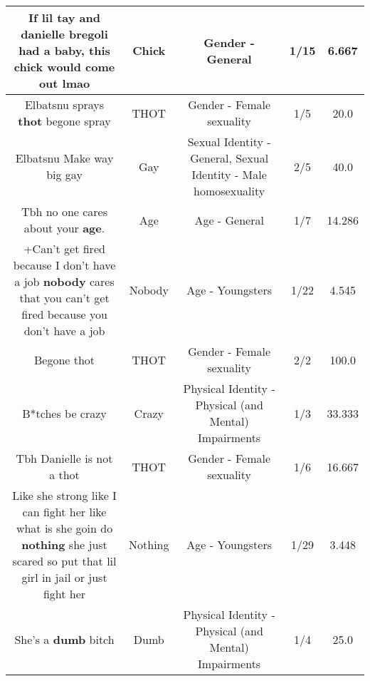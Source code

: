 \documentclass[11pt]{article}
\newlength\mylength
\begin{document}
\begin{center}
\begin{longtable}{|C{.65\mylength}|C{.30\mylength}|C{.12\mylength}|C{.12\mylength}|C{.12\mylength}|}
  \small If lil tay and danielle bregoli had a baby, this \textbf{chick} would come out lmao\normalsize   & Chick & Gender - General & 1/15 & 6.667 \\  \hline
  \small Elbatsnu sprays \textbf{thot} begone spray\normalsize   & THOT & Gender - Female sexuality & 1/5 & 20.0 \\  \hline
  \small Elbatsnu Make way big gay\normalsize   & Gay & Sexual Identity - General, Sexual Identity - Male homosexuality & 2/5 & 40.0 \\  \hline
  \small Tbh no one cares about your \textbf{age}.\normalsize   & Age & Age - General & 1/7 & 14.286 \\  \hline
  \small +Can't get fired because I don't have a job \textbf{nobody} cares that you can't get fired because you don't have a job\normalsize   & Nobody & Age - Youngsters & 1/22 & 4.545 \\  \hline
  \small Begone thot\normalsize   & THOT & Gender - Female sexuality & 2/2 & 100.0 \\  \hline
  \small B*tches be crazy\normalsize   & Crazy & Physical Identity - Physical (and Mental) Impairments & 1/3 & 33.333 \\  \hline
  \small Tbh Danielle is not a thot\normalsize   & THOT & Gender - Female sexuality & 1/6 & 16.667 \\  \hline
  \small Like she  strong like I can fight her like what is she goin do \textbf{nothing} she just scared so put that lil girl in jail or just fight her\normalsize   & Nothing & Age - Youngsters & 1/29 & 3.448 \\  \hline
  \small She's a \textbf{dumb} bitch\normalsize   & Dumb & Physical Identity - Physical (and Mental) Impairments & 1/4 & 25.0 \\  \hline

\end{longtable}
\end{center}
\end{document}
